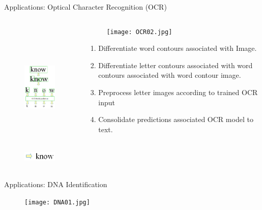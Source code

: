 \begin{frame}{Applications: Optical Character Recognition (OCR)}
\begin{columns}
\begin{column}{5cm}
\begin{figure}
\includegraphics[height=6.3cm]{Figures/ocr.png}\\
\includegraphics[height=0.7cm]{Figures/ocr1.png}
\end{figure}
\end{column}
\begin{column}{6cm}
\begin{figure}
\texttt{[image: OCR02.jpg]}
\end{figure}
\vspace{-0.5cm}
\begin{enumerate}
\item Differentiate word contours associated with Image.
\item Differentiate letter contours associated with word contours associated with word contour image.
\item Preprocess letter images according to trained OCR input
\item Consolidate predictions associated OCR model to text.
\end{enumerate}
\end{column}
\end{columns}
\end{frame}

\begin{frame}{Applications: DNA Identification}
\begin{figure}
\texttt{[image: DNA01.jpg]}
\end{figure}
\end{frame}

